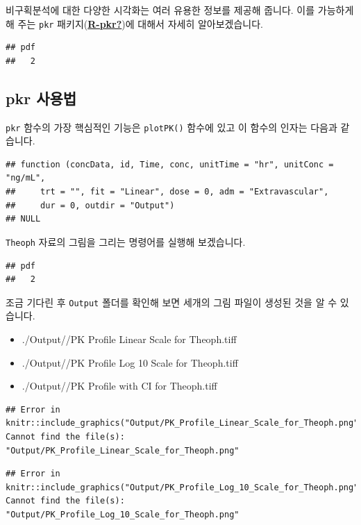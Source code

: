 \documentclass[
  11pt,
  krantz2, a4paper, twoside]{krantz}
\providecommand{\tightlist}{%
  \setlength{\itemsep}{0pt}\setlength{\parskip}{0pt}}
\begin{document}
비구획분석에 대한 다양한 시각화는 여러 유용한 정보를 제공해 줍니다.
이를 가능하게 해 주는 \texttt{pkr} 패키지(\protect\hyperlink{ref-R-pkr}{\textbf{R-pkr?}})에 대해서 자세히 알아보겠습니다.

\begin{verbatim}
## pdf 
##   2
\end{verbatim}

\hypertarget{pkr-manual}{%
\subsection{pkr 사용법}\label{pkr-manual}}

\texttt{pkr} 함수의 가장 핵심적인 기능은 \texttt{plotPK()} 함수에 있고 이 함수의 인자는 다음과 같습니다.

\begin{verbatim}
## function (concData, id, Time, conc, unitTime = "hr", unitConc = "ng/mL", 
##     trt = "", fit = "Linear", dose = 0, adm = "Extravascular", 
##     dur = 0, outdir = "Output") 
## NULL
\end{verbatim}

\texttt{Theoph} 자료의 그림을 그리는 명령어를 실행해 보겠습니다.

\begin{verbatim}
## pdf 
##   2
\end{verbatim}

조금 기다린 후 \texttt{Output} 폴더를 확인해 보면 세개의 그림 파일이 생성된 것을 알 수 있습니다.

\begin{itemize}
\tightlist
\item
  ./Output//PK Profile Linear Scale for Theoph.tiff
\item
  ./Output//PK Profile Log 10 Scale for Theoph.tiff
\item
  ./Output//PK Profile with CI for Theoph.tiff
\end{itemize}

\begin{verbatim}
## Error in knitr::include_graphics("Output/PK_Profile_Linear_Scale_for_Theoph.png"): Cannot find the file(s): "Output/PK_Profile_Linear_Scale_for_Theoph.png"
\end{verbatim}

\begin{verbatim}
## Error in knitr::include_graphics("Output/PK_Profile_Log_10_Scale_for_Theoph.png"): Cannot find the file(s): "Output/PK_Profile_Log_10_Scale_for_Theoph.png"
\end{verbatim}
\end{document}
